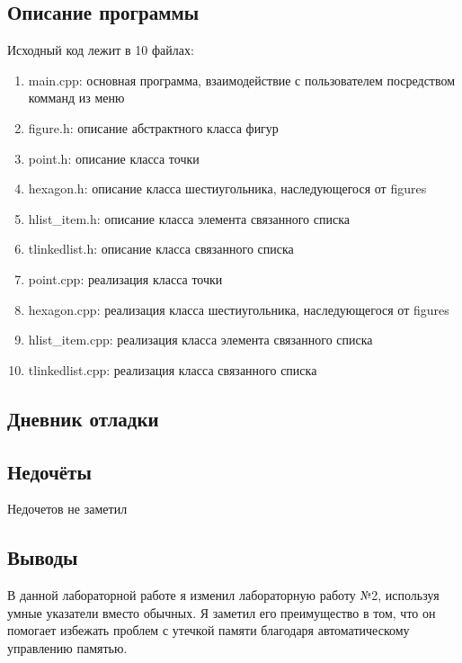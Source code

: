 \documentclass[12pt]{article}
\begin{document}
\subsection*{Описание программы}

Исходный код лежит в 10 файлах:
\begin{enumerate}
\item main.cpp: основная программа, взаимодействие с пользователем посредством комманд из меню

\item figure.h:    описание абстрактного класса фигур

\item point.h:     описание класса точки
\item hexagon.h: описание класса шестиугольника, наследующегося от figures
\item hlist\_item.h: описание класса элемента связанного списка
\item tlinkedlist.h: описание класса связанного списка

\item point.cpp:     реализация класса точки
\item hexagon.cpp:  реализация класса шестиугольника, наследующегося от figures
\item hlist\_item.cpp: реализация класса элемента связанного списка
\item tlinkedlist.cpp: реализация класса связанного списка

\end{enumerate}

\subsection*{Дневник отладки}

\subsection*{Недочёты}
Недочетов не заметил

\subsection*{Выводы}
В данной лабораторной работе я изменил лабораторную работу №2, используя умные указатели вместо обычных. Я заметил его преимущество в том, что он помогает избежать проблем с утечкой памяти благодаря автоматическому управлению памятью. 


\vfill
\end{document}
